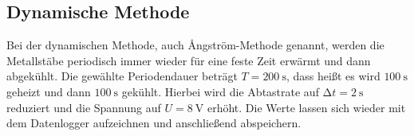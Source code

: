 \subsection{Dynamische Methode}
Bei der dynamischen Methode, auch Ångström-Methode genannt, werden die Metallstäbe periodisch immer wieder für eine feste Zeit erwärmt und dann abgekühlt. Die gewählte Periodendauer beträgt $T = \SI{200}{\second}$, dass heißt es wird $\SI{100}{\second}$ geheizt und dann $\SI{100}{\second}$ gekühlt.  Hierbei wird die Abtastrate auf $\increment t = \SI{2}{\second}$ reduziert und die Spannung auf $U = \SI{8}{\volt}$ erhöht.
Die Werte lassen sich wieder mit dem Datenlogger aufzeichnen und anschließend abspeichern.